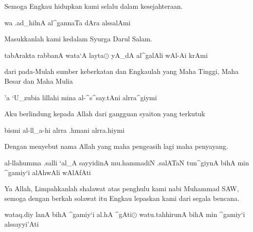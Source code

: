 \documentclass[a4paper,12pt,makeidx]{article}
\begin{document}
\vspace{0.5cm}
Semoga Engkau hidupkan kami selalu dalam kesejahteraan.

\vspace{0.5cm}  
\begin{arabtext}
wa .ad_hilnA al^gannaTa dAra alssalAmi
\end{arabtext}

\vspace{0.5cm}
Masukkanlah kami kedalam Syurga Darul Salam.

\vspace{0.5cm}   
\begin{arabtext}
tabArakta rabbanA wata`A layta$\odot$
yA_dA al^galAli wAl-Ai krAmi
\end{arabtext}

\vspace{0.5cm}
dari pada-Mulah sumber keberkatan
dan Engkaulah yang Maha Tinggi,
Maha Besar dan Maha Mulia
     
\vspace{0.5 cm}
\begin{arabtext}
'a `U_zubia lillahi mina al-^s^say.tAni alrra^giymi
\end{arabtext}

\vspace{0.5cm}
Aku berlindung kepada Allah dari gangguan syaiton yang terkutuk

\vspace{0.5 cm}
\begin{arabtext}
bismi al-ll_a-hi alrra .hmani alrra.hiymi
\end{arabtext}

\vspace{0.5cm}
Dengan menyebut nama Allah
yang maha pengeasih lagi maha penyayang.

\begin{arabtext}
\vspace{0.5 cm}
al-llahumma .salli `al_A sayyidinA mu.hammadiN
.salATaN tun^giynA bihA min
^gamiy`i alAhwAli wAlAfAti
\end{arabtext}

\vspace{0.5cm}
Ya Allah, Limpahkanlah shalawat atas penghulu
kami nabi Muhammad SAW, semoga dengan berkah solawat itu Engkau lepaskan kami dari segala bencana.
    
\vspace{0.5 cm}
\begin{arabtext}
wataq.diy lanA bihA ^gamiy`i al.hA ^gAti$\odot$
watu.tahhirunA bihA min ^gamiy`i alssayyi'Ati
\end{arabtext}
\end{document}
